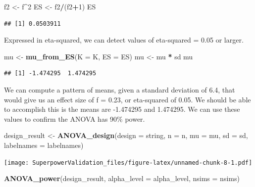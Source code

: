 \documentclass[]{book}
\newenvironment{Shaded}{\begin{snugshade}}{\end{snugshade}}
\newcommand{\DataTypeTok}[1]{\textcolor[rgb]{0.13,0.29,0.53}{#1}}
\newcommand{\DecValTok}[1]{\textcolor[rgb]{0.00,0.00,0.81}{#1}}
\newcommand{\KeywordTok}[1]{\textcolor[rgb]{0.13,0.29,0.53}{\textbf{#1}}}
\newcommand{\NormalTok}[1]{#1}
\newcommand{\OperatorTok}[1]{\textcolor[rgb]{0.81,0.36,0.00}{\textbf{#1}}}
\newcommand{\StringTok}[1]{\textcolor[rgb]{0.31,0.60,0.02}{#1}}
\begin{document}
\begin{Shaded}
\begin{Highlighting}[]
\NormalTok{f2 <-}\StringTok{ }\NormalTok{f}\OperatorTok{^}\DecValTok{2}
\NormalTok{ES <-}\StringTok{ }\NormalTok{f2}\OperatorTok{/}\NormalTok{(f2}\OperatorTok{+}\DecValTok{1}\NormalTok{)}
\NormalTok{ES}
\end{Highlighting}
\end{Shaded}

\begin{verbatim}
## [1] 0.0503911
\end{verbatim}

Expressed in eta-squared, we can detect values of eta-squared = 0.05 or larger.

\begin{Shaded}
\begin{Highlighting}[]
\NormalTok{mu <-}\StringTok{ }\KeywordTok{mu_from_ES}\NormalTok{(}\DataTypeTok{K =}\NormalTok{ K, }\DataTypeTok{ES =}\NormalTok{ ES)}
\NormalTok{mu <-}\StringTok{ }\NormalTok{mu }\OperatorTok{*}\StringTok{ }\NormalTok{sd}
\NormalTok{mu}
\end{Highlighting}
\end{Shaded}

\begin{verbatim}
## [1] -1.474295  1.474295
\end{verbatim}

We can compute a pattern of means, given a standard deviation of 6.4, that would give us an effect size of f = 0.23, or eta-squared of 0.05. We should be able to accomplish this is the means are -1.474295 and 1.474295. We can use these values to confirm the ANOVA has 90\% power.

\begin{Shaded}
\begin{Highlighting}[]
\NormalTok{design_result <-}\StringTok{ }\KeywordTok{ANOVA_design}\NormalTok{(}\DataTypeTok{design =}\NormalTok{ string,}
                   \DataTypeTok{n =}\NormalTok{ n, }
                   \DataTypeTok{mu =}\NormalTok{ mu, }
                   \DataTypeTok{sd =}\NormalTok{ sd, }
                   \DataTypeTok{labelnames =}\NormalTok{ labelnames)}
\end{Highlighting}
\end{Shaded}

\texttt{[image: SuperpowerValidation\_files/figure-latex/unnamed-chunk-8-1.pdf]}

\begin{Shaded}
\begin{Highlighting}[]
\KeywordTok{ANOVA_power}\NormalTok{(design_result, }\DataTypeTok{alpha_level =}\NormalTok{ alpha_level, }\DataTypeTok{nsims =}\NormalTok{ nsims)}
\end{Highlighting}
\end{Shaded}
\end{document}
